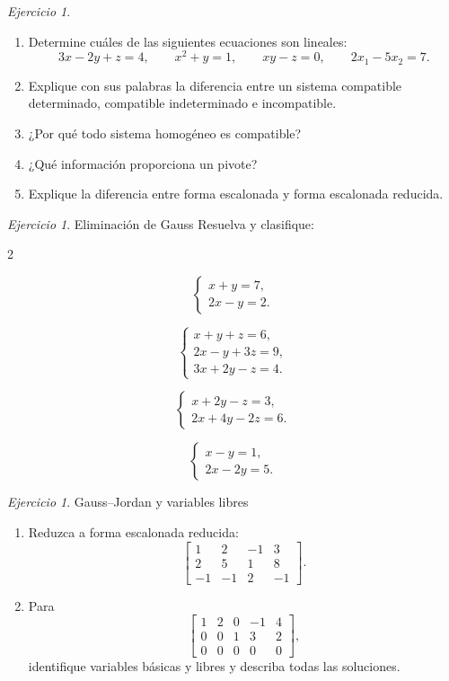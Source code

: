 \documentclass[12pt]{article}
\theoremstyle{remark}
\newtheorem{Ejer}[definicion]{Ejercicio}
\begin{document}
\begin{Ejer}
\begin{enumerate}
\item Determine cuáles de las siguientes ecuaciones son lineales:
\[
3x-2y+z=4,\qquad x^2+y=1,\qquad xy-z=0,\qquad 2x_1-5x_2=7.
\]
\item Explique con sus palabras la diferencia entre un sistema compatible determinado, compatible
indeterminado e incompatible.
\item ¿Por qué todo sistema homogéneo es compatible?
\item ¿Qué información proporciona un pivote?
\item Explique la diferencia entre forma escalonada y forma escalonada reducida.
\end{enumerate}
\end{Ejer}
\begin{Ejer} Eliminación de Gauss
Resuelva y clasifique:
\begin{enumerate}
\begin{multicols}{2}
\item
\[
\begin{cases}
x+y=7,\\
2x-y=2.
\end{cases}
\]
\item
\[
\begin{cases}
x+y+z=6,\\
2x-y+3z=9,\\
3x+2y-z=4.
\end{cases}
\]
\item
\[
\begin{cases}
x+2y-z=3,\\
2x+4y-2z=6.
\end{cases}
\]
\item
\[
\begin{cases}
x-y=1,\\
2x-2y=5.
\end{cases}
\]
\end{multicols}
\end{enumerate}
\end{Ejer}
\begin{Ejer}  Gauss--Jordan y variables libres
\begin{enumerate}

\item Reduzca a forma escalonada reducida:
\[
\left[
\begin{array}{ccc|c}
1&2&-1&3\\
2&5&1&8\\
-1&-1&2&-1
\end{array}
\right].
\]
\item Para
\[
\left[
\begin{array}{cccc|c}
1&2&0&-1&4\\
0&0&1&3&2\\
0&0&0&0&0
\end{array}
\right],
\]
identifique variables básicas y libres y describa todas las soluciones.
\end{enumerate}
\end{Ejer}
\end{document}
